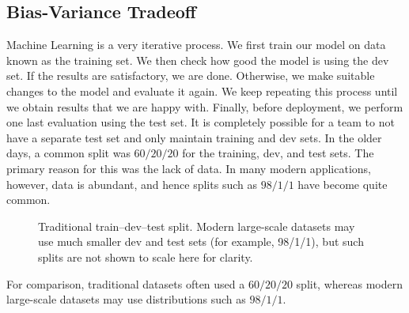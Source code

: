 \documentclass[12pt]{article}
\begin{document}
\subsection{Bias-Variance Tradeoff}
Machine Learning is a very iterative process. We first train our model on data known as the training set. We then check how good the model is using the dev set. If the results are satisfactory, we are done. Otherwise, we make suitable changes to the model and evaluate it again. We keep repeating this process until we obtain results that we are happy with. Finally, before deployment, we perform one last evaluation using the test set. It is completely possible for a team to not have a separate test set and only maintain training and dev sets. In the older days, a common split was $60/20/20$ for the training, dev, and test sets. The primary reason for this was the lack of data. In many modern applications, however, data is abundant, and hence splits such as $98/1/1$ have become quite common. \begin{figure}[h]
    \centering

    \caption{Traditional train--dev--test split. Modern large-scale datasets may use much smaller dev and test sets (for example, 98/1/1), but such splits are not shown to scale here for clarity.}
\end{figure} For comparison, traditional datasets often used a $60/20/20$ split, whereas modern large-scale datasets may use distributions such as $98/1/1$.
\end{document}
